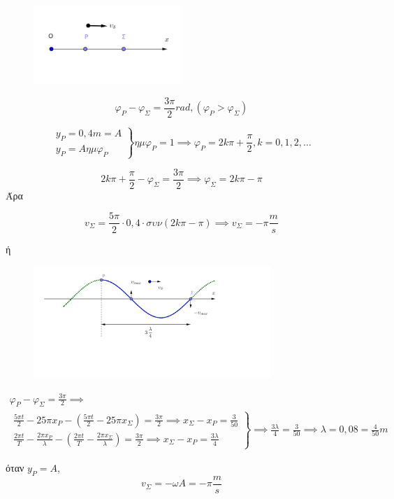 \documentclass[12pt]{article}
\begin{document}
\begin{enumerate}
      \begin{figure}[h]
        \includegraphics[width=0.5\textwidth]{ΦυσικήΓ4.png}
        \centering
      \end{figure}

      $$φ_Ρ-φ_Σ=\frac{3\pi}{2}rad,(φ_Ρ>φ_Σ)$$

      $$\left. \begin{matrix}y_Ρ=0,4m=A \\ y_Ρ=Aημφ_Ρ\end{matrix} \right\} ημφ_Ρ=1\implies φ_Ρ=2k\pi+\frac{\pi}{2},k=0,1,2,\ldots$$

      $$2k\pi+\frac{\pi}{2}-φ_Σ=\frac{3\pi}{2}\implies φ_Σ=2k\pi-\pi$$
      Άρα

      $$v_Σ=\frac{5\pi}{2}\cdot 0,4\cdot συν\left(2k\pi-\pi\right)\implies v_Σ=-\pi \frac{m}{s}$$

      ή

      \begin{figure}[h]
        \includegraphics[width=0.8\textwidth]{ΦυσικήΓ4_2.png}
        \centering
      \end{figure}

      \begin{gather*}
        φ_Ρ-φ_Σ=\frac{3\pi}{2}\implies \\
        \left. \begin{matrix}\frac{5\pi t}{2}-25\pi x_Ρ-\left(\frac{5\pi t}{2}-25\pi x_Σ\right)=\frac{3\pi}{2}\implies x_Σ-x_Ρ=\frac{3}{50} \\ \frac{2\pi t}{T}-\frac{2\pi x_Ρ}{λ}-\left(\frac{2\pi t}{T}-\frac{2\pi x_Σ}{λ}\right)=\frac{3\pi}{2}\implies x_Σ-x_Ρ=\frac{3λ}{4}\end{matrix} \right\}\implies \frac{3λ}{4}=\frac{3}{50}\implies λ=0,08=\frac{4}{50}m
      \end{gather*}

      όταν $y_Ρ=A$, $$v_Σ=-ωA=-\pi \frac{m}{s}$$
  \end{enumerate}
\end{document}
